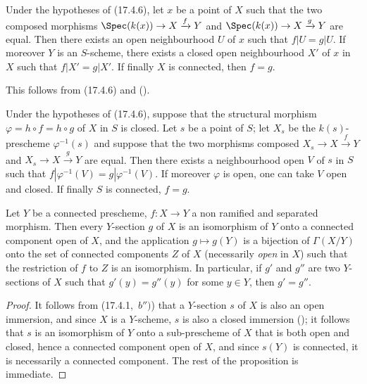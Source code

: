 \begin{corollary}[17.4.7]
\label{IV.17.4.7}
Under the hypotheses of (17.4.6), let $x$ be a point of $X$ such that the two composed morphisms $\Spec(k(x))\to X\xrightarrow{f} Y$ and $\Spec(k(x))\to X\xrightarrow{g} Y$ are equal.
Then there exists an open neighbourhood $U$ of $x$ such that $f|U=g|U$.
If moreover $Y$ is an $S$-scheme, there exists a closed open neighbourhood $X'$ of $x$ in $X$ such that $f|X'=g|X'$.
If finally $X$ is connected, then $f=g$.
\end{corollary}

This follows from (17.4.6) and ().

\begin{corollary}[17.4.8]
\label{IV.17.4.8}
Under the hypotheses of (17.4.6), suppose that the structural morphism $\varphi=h\circ f=h\circ g$ of $X$ in $S$ is closed.
Let $s$ be a point of $S$; let $X_s$ be the $k(s)$-prescheme $\varphi^{-1}(s)$ and suppose that the two morphisms composed $X_s\to X\xrightarrow{f} Y$ and $X_s\to X\xrightarrow{g} Y$ are equal.
Then there exists a neighbourhood open $V$ of $s$ in $S$ such that $f|\varphi^{-1}(V)=g|\varphi^{-1}(V)$.
If moreover $\varphi$ is open, one can take $V$ open and closed.
If finally $S$ is connected, $f=g$.
\end{corollary}

\begin{proposition}[17.4.9]
\label{IV.17.4.9}
Let $Y$ be a connected prescheme, $f:X\to Y$ a non ramified and separated morphism.
Then every $Y$-section $g$ of $X$ is an isomorphism of $Y$ onto a connected component open of $X$, and the application $g\mapsto g(Y)$ is a bijection of $\Gamma(X/Y)$ onto the set of connected components $Z$ of $X$ (necessarily \emph{open} in $X$) such that the restriction of $f$ to $Z$ is an isomorphism.
In particular, if $g'$ and $g''$ are two $Y$-sections of $X$ such that $g'(y)=g''(y)$ for some $y\in Y$, then $g'=g''$.
\end{proposition}

\begin{proof}
It follows from (17.4.1,~$b'')$) that a $Y$-section $s$ of $X$ is also an open immersion, and since $X$ is a $Y$-scheme, $s$ is also a closed immersion (); it follows that $s$ is an isomorphism of $Y$ onto a sub-prescheme of $X$ that is both open and closed, hence a connected component open of $X$, and since $s(Y)$ is connected, it is necessarily a connected component.
The rest of the proposition is immediate.
\end{proof}

